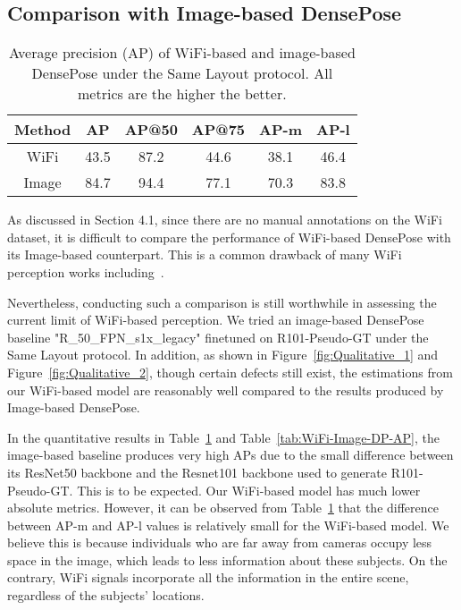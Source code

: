 \documentclass[sigconf, anonymous=false]{acmart}
\begin{document}



\subsection{Comparison with Image-based DensePose}

\begin{table}[!htb]
\begin{center}
\begin{tabular}{ |c|c|c|c|c|c| } 
 \hline
 Method & AP & AP@50 & AP@75 & AP-m & AP-l \\ 
 \hline
 WiFi & 43.5 & 87.2 & 44.6 & 38.1 & 46.4\\ 
 \hline
 Image & 84.7 & 94.4 & 77.1 & 70.3 & 83.8\\ 
 \hline
\end{tabular}
\end{center}
\caption{Average precision (AP) of WiFi-based and image-based DensePose under the Same Layout protocol. All metrics are the higher the better.}
\label{tab:WiFi-Image-AP}
\end{table}


As discussed in Section 4.1, since there are no manual annotations on the WiFi dataset, it is difficult to compare the performance of WiFi-based DensePose with its Image-based counterpart. This is a common drawback of many WiFi perception works including~\cite{Wanghuang2019}.

Nevertheless, conducting such a comparison is still worthwhile in assessing the current limit of WiFi-based perception. We tried an image-based DensePose baseline "R\_50\_FPN\_s1x\_legacy"  finetuned on R101-Pseudo-GT under the Same Layout protocol. In addition, as shown in Figure~\ref{fig:Qualitative_1} and Figure~\ref{fig:Qualitative_2}, though certain defects still exist, the estimations from our WiFi-based model are reasonably well compared to the results produced by Image-based DensePose. 

In the quantitative results in Table~\ref{tab:WiFi-Image-AP} and Table~\ref{tab:WiFi-Image-DP-AP}, the image-based baseline produces very high APs due to the small difference between its ResNet50 backbone and the Resnet101 backbone used to generate R101-Pseudo-GT. This is to be expected. Our WiFi-based model has much lower absolute metrics. However, it can be observed from Table~\ref{tab:WiFi-Image-AP} that the difference between AP-m and AP-l values is relatively small for the WiFi-based model. We believe this is because individuals who are far away from cameras occupy less space in the image, which leads to less information about these subjects. On the contrary, WiFi signals incorporate all the information in the entire scene, regardless of the subjects' locations. 
\end{document}
